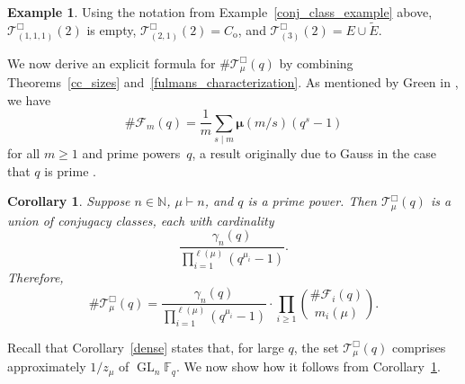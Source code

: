 \documentclass[10pt]{article}
\newtheorem{corollary}[theorem]{Corollary}
\theoremstyle{definition}
\newtheorem{example}[theorem]{Example}
\DeclareMathOperator{\GL}{GL}
\newcommand{\F}{\mathbb{F}}
\newcommand{\CF}{\mathcal{F}}
\newcommand{\N}{\mathbb{N}}
\newcommand{\CT}{\mathcal{T}}
\newcommand{\moebius}{\pmb{\mu}}
\begin{document}
\begin{example}
Using the notation from Example~\ref{conj_class_example} above,
\(\CT^\Box_{(1,1,1)} (2) \) is empty,
\(\CT^\Box_{(2,1)} (2) = C_{\mathrm{o}}\), and
\(\CT^\Box_{(3)} (2) = E \cup \tilde{E}\).
\end{example}

We now derive an explicit formula for \(\# \CT_\mu^\Box (q)\) by combining Theorems~\ref{cc_sizes} and~\ref{fulmans_characterization}.
As mentioned by Green in \cite{green}, we have
\begin{equation}
\label{size_of_Fm}
\# \CF_m (q) = \frac{1}{m} \sum_{s \mid m} \moebius(m/s)(q^s-1)
\end{equation}
for all \(m \geq 1\) and prime powers~\(q\),
a result originally due to Gauss in the case that \(q\) is prime \cite{gauss}.

\begin{corollary}
\label{rss_cc_and_cycle_type_sizes}
Suppose \(n \in \N\), \(\mu \vdash n\), and \(q\) is a prime power.
Then \(\CT_\mu^\Box (q)\) is a union of conjugacy classes, each with cardinality
\[
\frac{\gamma_n(q)}{\prod_{i=1}^{\ell(\mu)} (q^{\mu_i}-1)}.
\]
Therefore,
\[
\# \CT_\mu^\Box (q)
=
\frac{\gamma_n(q)}{\prod_{i=1}^{\ell(\mu)} (q^{\mu_i}-1)}
\cdot
\prod_{i \geq 1}
\binom{\# \CF_i (q)}{m_i(\mu)}.
\]
\end{corollary}

Recall that Corollary~\ref{dense} states that, for large \(q\), the set \(\CT^\Box_\mu (q)\) comprises approximately \(1 / z_\mu\) of \(\GL_n \F_q\).
We now show how it follows from Corollary~\ref{rss_cc_and_cycle_type_sizes}.
\end{document}
